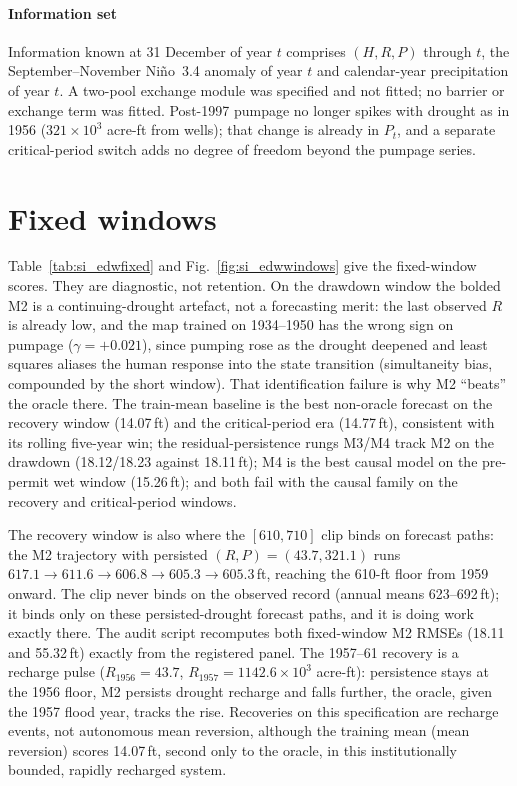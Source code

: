 \paragraph{Information set} Information known at 31 December of year $t$ comprises $(H,R,P)$ through $t$, the September--November Ni\~no~3.4 anomaly of year $t$ and calendar-year precipitation of year $t$. A two-pool exchange module was specified and not fitted; no barrier or exchange term was fitted. Post-1997 pumpage no longer spikes with drought as in 1956 ($321\times10^3$ acre-ft from wells); that change is already in $P_t$, and a separate critical-period switch adds no degree of freedom beyond the pumpage series.

\FloatBarrier
\section{Fixed windows}\label{si:edwfixed}

Table~\ref{tab:si_edwfixed} and Fig.~\ref{fig:si_edwwindows} give the fixed-window scores. They are diagnostic, not retention. On the drawdown window the bolded M2 is a continuing-drought artefact, not a forecasting merit: the last observed $R$ is already low, and the map trained on 1934--1950 has the wrong sign on pumpage ($\gamma=+0.021$), since pumping rose as the drought deepened and least squares aliases the human response into the state transition (simultaneity bias, compounded by the short window). That identification failure is why M2 ``beats'' the oracle there. The train-mean baseline is the best non-oracle forecast on the recovery window (14.07\,ft) and the critical-period era (14.77\,ft), consistent with its rolling five-year win; the residual-persistence rungs M3/M4 track M2 on the drawdown (18.12/18.23 against 18.11\,ft); M4 is the best causal model on the pre-permit wet window (15.26\,ft); and both fail with the causal family on the recovery and critical-period windows.

The recovery window is also where the $[610,710]$ clip binds on forecast paths: the M2 trajectory with persisted $(R,P)=(43.7,321.1)$ runs $617.1\to611.6\to606.8\to605.3\to605.3$\,ft, reaching the 610-ft floor from 1959 onward. The clip never binds on the observed record (annual means 623--692\,ft); it binds only on these persisted-drought forecast paths, and it is doing work exactly there. The audit script recomputes both fixed-window M2 RMSEs (18.11 and 55.32\,ft) exactly from the registered panel. The 1957--61 recovery is a recharge pulse ($R_{1956}=43.7$, $R_{1957}=1142.6\times10^3$ acre-ft): persistence stays at the 1956 floor, M2 persists drought recharge and falls further, the oracle, given the 1957 flood year, tracks the rise. Recoveries on this specification are recharge events, not autonomous mean reversion, although the training mean (mean reversion) scores 14.07\,ft, second only to the oracle, in this institutionally bounded, rapidly recharged system.

